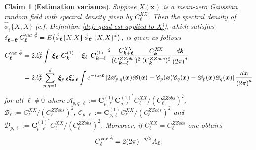 \documentclass[10pt,noinfoline]{imsart}
\newtheorem{claim}{Claim}
\newcommand{\bs}{\boldsymbol}
\begin{document}
%
%

\begin{claim}[{\bf Estimation variance}]\label{thm: quantify the var fluctuations of hat phi}
    Suppose $X(\bs x)$ is a mean-zero Gaussian random field with spectral density given by $C^{X\!X}_{\bs \ell}$.
    Then the spectral density of $\hat\phi_{\bs \ell}\{X,\!X\}$ (c.f. Definition \ref{def: quad est applied to X}), which satisfies $\delta^{\phantom{*}}_{\bs \ell-\bs \ell^\prime}C^{\text{\rm var }\hat\phi}_{\bs \ell} = E\big(\hat\phi_{\bs \ell}\{X,\!X\} \, \hat\phi_{\bs \ell^\prime}\{X,\!X\}^*\big) $, is given as follows
    \begin{align}
        C_{\bs\ell}^{\text{\rm var }\hat{\phi}}
        &= 2 A_{\bs\ell}^2
        \int
        \Bigl|\bs\xi_{\bs\ell}\!\cdot\!\bs C^{{(1)}}_{\bs k} - \bs\xi_{\bs\ell}\!\cdot\! \bs C^{{(1)}}_{\bs k+\bs \ell}\Bigr|^2
        \frac{C^{X\!X}_{\bs k+\bs\ell}}{(C^{ZZobs}_{\bs k+\bs\ell})^2}
        \frac{C^{X\!X}_{\bs k}}{(C^{ZZobs}_{\bs k})^2}
         \frac{d\bs k}{{(2\pi)}^{d}} \label{appendix, claim raw var} \\
        &= 2 A_{\bs\ell}^2  \sum_{p,q = 1}^d\bs\xi_{p,\bs\ell}\bs\xi^*_{q,\bs\ell}\int e^{-i\bs x\cdot\bs \ell} \left[2\mathscr A_{p,q}(\bs x)\mathscr B(\bs x)  - \mathscr C_{p}(\bs x)\mathscr C_{q}(\bs x) -  \mathscr D_{p}(\bs x)\mathscr D_{q}(\bs x)\right]  \frac{d\bs x}{{(2\pi)}^{d}} \label{appendix, claim fast var}
    \end{align}
    for all $\bs \ell\neq 0$
    where $\mathscr A_{p,q, \bs \ell}:= \bs C^{(1)}_{p,\bs \ell} \bs C^{{(1)}^*}_{q,\bs \ell} C^{X\!X}_{\bs\ell} / (C^{ZZobs}_{\bs \ell})^2$, $\mathscr B_\ell:=  C^{X\!X}_{\bs\ell} / (C^{ZZobs}_{\bs\ell})^2$, $\mathscr C_{p,\bs\ell}:= \bs C^{(1)}_{p,\bs\ell}  C^{X\!X}_{\bs\ell} / (C^{ZZobs}_{\bs\ell})^2$ and $\mathscr D_{p,\bs\ell}:= \bs C^{{(1)}^*}_{p,\bs\ell}  C^{X\!X}_{\bs\ell} / (C^{ZZobs}_{\bs\ell})^2$.
    Moreover, if $C_{\bs\ell}^{X\!X} = C^{ZZobs}_{\bs\ell}$  one obtains
    \begin{equation}
    C_{\bs\ell}^{\text{\rm var }\hat{\phi}} =  2{(2\pi)}^{-d/2} A_{\bs\ell}.
    \end{equation}
\end{claim}
\end{document}
